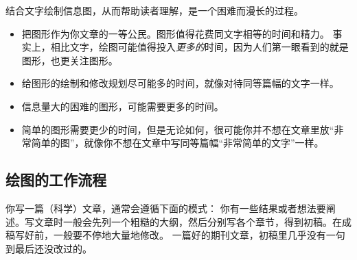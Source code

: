 结合文字绘制信息图，从而帮助读者理解，是一个困难而漫长的过程。

\eohs

\begin{itemize}
\item
  把图形作为你文章的一等公民。图形值得花费同文字相等的时间和精力。
  事实上，相比文字，绘图可能值得投入\emph{更多的}时间，因为人们第一眼看到的就是图形，也更关注图形。
\item
  给图形的绘制和修改规划尽可能多的时间，就像对待同等篇幅的文字一样。
\item
  信息量大的困难的图形，可能需要更多的时间。
\item
  简单的图形需要更少的时间，但是无论如何，很可能你并不想在文章里放“非常简单的图”，就像你不想在文章中写同等篇幅“非常简单的文字”一样。
\end{itemize}


\subsection{绘图的工作流程}

\bohs

你写一篇（科学）文章，通常会遵循下面的模式：
你有一些结果或者想法要阐述。写文章时一般会先列一个粗糙的大纲，然后分别写各个章节，得到初稿。在成稿写好前，一般要不停地大量地修改。
一篇好的期刊文章，初稿里几乎没有一句到最后还没改过的。

